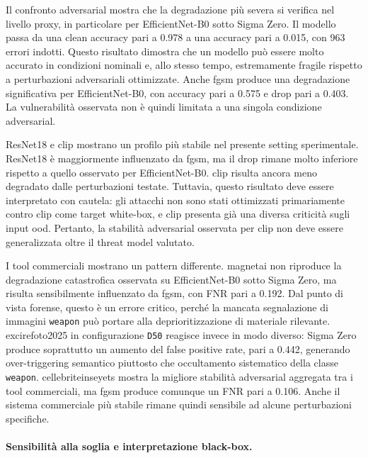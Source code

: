 Il confronto adversarial mostra che la degradazione più severa si verifica nel
livello proxy, in particolare per EfficientNet-B0 sotto Sigma Zero. Il modello
passa da una clean accuracy pari a 0.978 a una accuracy pari a 0.015, con 963
errori indotti. Questo risultato dimostra che un modello può essere molto
accurato in condizioni nominali e, allo stesso tempo, estremamente fragile
rispetto a perturbazioni adversariali ottimizzate. Anche \gls{fgsm} produce una
degradazione significativa per EfficientNet-B0, con accuracy pari a 0.575 e drop
pari a 0.403. La vulnerabilità osservata non è quindi limitata a una singola
condizione adversarial.

ResNet18 e \gls{clip} mostrano un profilo più stabile nel presente setting
sperimentale. ResNet18 è maggiormente influenzato da \gls{fgsm}, ma il drop
rimane molto inferiore rispetto a quello osservato per EfficientNet-B0.
\gls{clip} risulta ancora meno degradato dalle perturbazioni testate. Tuttavia,
questo risultato deve essere interpretato con cautela: gli attacchi non sono
stati ottimizzati primariamente contro \gls{clip} come target white-box, e
\gls{clip} presenta già una diversa criticità sugli input \gls{ood}. Pertanto,
la stabilità adversarial osservata per \gls{clip} non deve essere generalizzata
oltre il threat model valutato.

I tool commerciali mostrano un pattern differente. \gls{magnetai} non riproduce
la degradazione catastrofica osservata su EfficientNet-B0 sotto Sigma Zero, ma
risulta sensibilmente influenzato da \gls{fgsm}, con FNR pari a 0.192. Dal punto
di vista forense, questo è un errore critico, perché la mancata segnalazione di
immagini \texttt{weapon} può portare alla deprioritizzazione di materiale
rilevante. \gls{excirefoto2025} in configurazione \texttt{D50} reagisce invece
in modo diverso: Sigma Zero produce soprattutto un aumento del false positive
rate, pari a 0.442, generando over-triggering semantico piuttosto che
occultamento sistematico della classe \texttt{weapon}. \gls{cellebriteinseyets}
mostra la migliore stabilità adversarial aggregata tra i tool commerciali, ma
\gls{fgsm} produce comunque un FNR pari a 0.106. Anche il sistema commerciale
più stabile rimane quindi sensibile ad alcune perturbazioni specifiche.

\paragraph{Sensibilità alla soglia e interpretazione black-box.}

